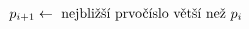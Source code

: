 \documentclass[preview]{standalone}
\begin{document}
\begin{align*}
&\hspace*{12pt}p_{i+1} \leftarrow \text{ nejbližší prvočíslo větší než } p_i\\
\end{align*}
\end{document}
